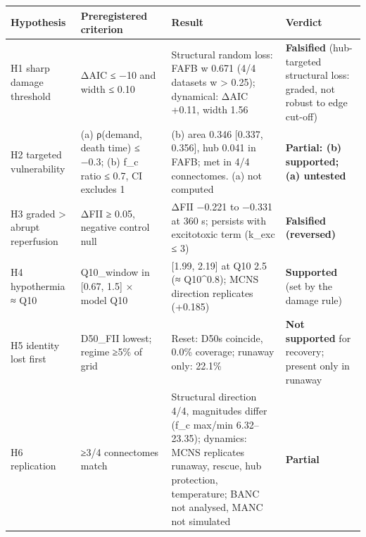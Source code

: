 \documentclass[11pt]{article}
\newcounter{none}
\begin{document}
{\def\LTcaptype{none} %
\begin{longtable}[]{@{}
  >{\raggedright\arraybackslash}p{}
  >{\raggedright\arraybackslash}p{}
  >{\raggedright\arraybackslash}p{}
  >{\raggedright\arraybackslash}p{}@{}}
\toprule\noalign{}
\begin{minipage}[b]{\linewidth}\raggedright
Hypothesis
\end{minipage} & \begin{minipage}[b]{\linewidth}\raggedright
Preregistered criterion
\end{minipage} & \begin{minipage}[b]{\linewidth}\raggedright
Result
\end{minipage} & \begin{minipage}[b]{\linewidth}\raggedright
Verdict
\end{minipage} \\
\midrule\noalign{}
\endhead
\bottomrule\noalign{}
\endlastfoot
H1 sharp damage threshold & ΔAIC ≤ −10 and width ≤ 0.10 & Structural random loss: FAFB w 0.671 (4/4 datasets w \textgreater{} 0.25); dynamical: ΔAIC +0.11, width 1.56 & \textbf{Falsified} (hub-targeted structural loss: graded, not robust to edge cut-off) \\
H2 targeted vulnerability & (a) ρ(demand, death time) ≤ −0.3; (b) f\_c ratio ≤ 0.7, CI excludes 1 & (b) area 0.346 {[}0.337, 0.356{]}, hub 0.041 in FAFB; met in 4/4 connectomes. (a) not computed & \textbf{Partial: (b) supported; (a) untested} \\
H3 graded \textgreater{} abrupt reperfusion & ΔFII ≥ 0.05, negative control null & ΔFII −0.221 to −0.331 at 360 s; persists with excitotoxic term (k\_exc ≤ 3) & \textbf{Falsified (reversed)} \\
H4 hypothermia ≈ Q10 & Q10\_window in {[}0.67, 1.5{]} × model Q10 & 2.09 {[}1.99, 2.19{]} at Q10 2.5 (≈ Q10\^{}0.8); MCNS direction replicates (+0.185) & \textbf{Supported} (set by the damage rule) \\
H5 identity lost first & D50\_FII lowest; regime ≥5\% of grid & Reset: D50s coincide, 0.0\% coverage; runaway only: 22.1\% & \textbf{Not supported} for recovery; present only in runaway \\
H6 replication & ≥3/4 connectomes match & Structural direction 4/4, magnitudes differ (f\_c max/min 6.32--23.35); dynamics: MCNS replicates runaway, rescue, hub protection, temperature; BANC not analysed, MANC not simulated & \textbf{Partial} \\
\end{longtable}
}
\end{document}
